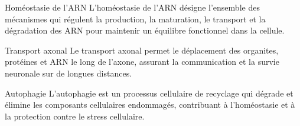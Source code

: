  Homéostasie de l’ARN
L’homéostasie de l’ARN désigne l’ensemble des mécanismes qui régulent la production, la maturation, le transport et la dégradation des ARN pour maintenir un équilibre fonctionnel dans la cellule.

 Transport axonal
Le transport axonal permet le déplacement des organites, protéines et ARN le long de l’axone, assurant la communication et la survie neuronale sur de longues distances.

 Autophagie
L’autophagie est un processus cellulaire de recyclage qui dégrade et élimine les composants cellulaires endommagés, contribuant à l’homéostasie et à la protection contre le stress cellulaire.
